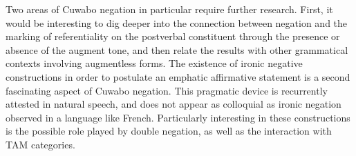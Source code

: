 \documentclass[output=paper,colorlinks=true, citecolor=brown,draftmode]{langscibook}
\begin{document}

Two areas of Cuwabo negation in particular require further research. First, it would be interesting to dig deeper into the connection between negation and the marking of referentiality on the postverbal constituent through the presence or absence of the augment tone, and then relate the results with other grammatical contexts involving augmentless forms. The existence of ironic negative constructions in order to postulate an emphatic affirmative statement is a second fascinating aspect of Cuwabo negation. This pragmatic device is recurrently attested in natural speech, and does not appear as colloquial as ironic negation observed in a language like French. Particularly interesting in these constructions is the possible role played by double negation, as well as the interaction with TAM categories.
\end{document}
